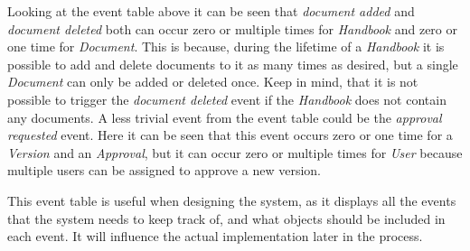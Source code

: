 Looking at the event table above it can be seen that \textit{document added} and \textit{document deleted} both can occur zero or multiple times for \textit{Handbook} and zero or one time for \textit{Document}.
This is because, during the lifetime of a \textit{Handbook} it is possible to add and delete documents to it as many times as desired, but a single \textit{Document} can only be added or deleted once.
Keep in mind, that it is not possible to trigger the \textit{document deleted} event if the \textit{Handbook} does not contain any documents.
A less trivial event from the event table could be the \textit{approval requested} event.
Here it can be seen that this event occurs zero or one time for a \textit{Version} and an \textit{Approval}, but it can occur zero or multiple times for \textit{User} because multiple users can be assigned to approve a new version.

This event table is useful when designing the system, as it displays all the events that the system needs to keep track of, and what objects should be included in each event.
It will influence the actual implementation later in the process.
